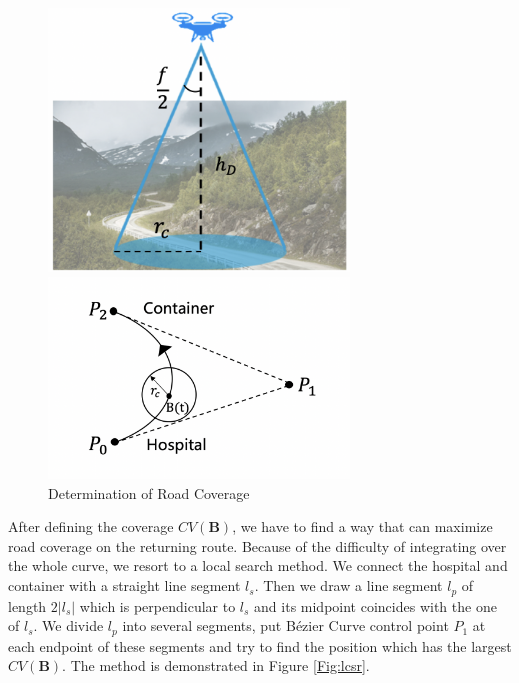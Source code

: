 \documentclass{mcmthesis}
\begin{document}
\begin{figure}[ht]
	\centering
	\begin{minipage}[t]{0.48\textwidth}
		\centering
		\includegraphics[width=8cm,height=7cm]{figures/fov.png}
	\end{minipage}
	\begin{minipage}[t]{0.48\textwidth}
		\centering
		\includegraphics[width=8cm]{figures/route_coverage.png}
	\end{minipage}
	\caption{Determination of Road Coverage}
	\label{Fig:rdcv}
\end{figure}

After defining the coverage $CV(\mathbf{B})$, we have to find a way that can maximize road coverage on the returning route. Because of the difficulty of integrating over the whole curve, we resort to a local search method. We connect the hospital and container with a straight line segment $l_s$. Then we draw a line segment $l_p$ of length $2|l_s|$ which is perpendicular to $l_s$ and its midpoint coincides with the one of $l_s$. We divide $l_p$ into several segments, put B\'{e}zier Curve control point $P_1$ at each endpoint of these segments and try to find the position which has the largest $CV(\mathbf{B})$. The method is demonstrated in Figure \ref{Fig:lcsr}.
\end{document}
